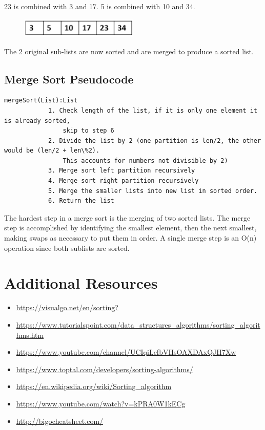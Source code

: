 23 is  combined with 3 and 17.  5 is combined with 10 and 34.

\begin{figure}[H]
\centering
\includegraphics[width=0.5\textwidth]{pictures/merge7.png}
\label{fig:merge7}
\end{figure}

The 2 original sub-lists are now sorted and are merged to produce a sorted list.

\subsection{Merge Sort Pseudocode}

\begin{lstlisting}
mergeSort(List):List
            1. Check length of the list, if it is only one element it is already sorted, 
                skip to step 6
            2. Divide the list by 2 (one partition is len/2, the other would be (len/2 + len\%2). 
                This accounts for numbers not divisible by 2) 
            3. Merge sort left partition recursively
            4. Merge sort right partition recursively
            5. Merge the smaller lists into new list in sorted order.
            6. Return the list
\end{lstlisting}

The hardest step in a merge sort is the merging of two sorted lists.  The merge step is accomplished by identifying the smallest element, then the next smallest, making swaps as necessary to put them in order.  A single merge step is an O(n) operation since both sublists are sorted.

\section{Additional Resources}

\begin{itemize}
\item \url{https://visualgo.net/en/sorting?}
\item \url{https://www.tutorialspoint.com/data_structures_algorithms/sorting_algorithms.htm}
\item \url{https://www.youtube.com/channel/UCIqiLefbVHsOAXDAxQJH7Xw}
\item \url{https://www.toptal.com/developers/sorting-algorithms/}
\item \url{https://en.wikipedia.org/wiki/Sorting_algorithm}
\item \url{https://www.youtube.com/watch?v=kPRA0W1kECg}
\item \url{http://bigocheatsheet.com/}

\end{itemize}

